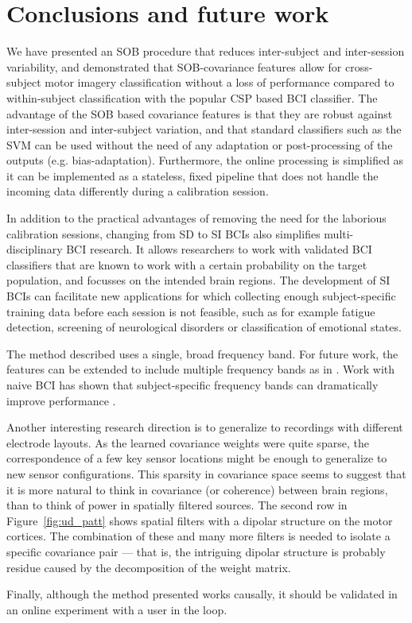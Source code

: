 \section{Conclusions and future work}
\begin{sloppypar}
We have presented an \ac{SOB} procedure that reduces inter-subject and
inter-session variability, and demonstrated that \ac{SOB}-covariance features
allow for cross-subject motor imagery classification without a loss of
performance compared to within-subject classification with the popular \ac{CSP}
based \ac{BCI} classifier.
%
The advantage of the \ac{SOB} based covariance features is that they are robust
against inter-session and inter-subject variation, and that standard
classifiers such as the \ac{SVM} can be used without the need of any adaptation
or post-processing of the outputs (e.g. bias-adaptation).
%
Furthermore, the online processing is simplified as it can be implemented as a
stateless, fixed pipeline that does not handle the incoming data differently
during a calibration session.

In addition to the practical advantages of removing the need for the laborious
calibration sessions, changing from \acl{SD} to \acl{SI} \acp{BCI} also
simplifies multi-disciplinary \ac{BCI} research. It allows researchers to work
with validated \ac{BCI} classifiers that are known to work with a certain
probability on the target population, and focusses on the intended brain
regions.
% 
The development of \acl{SI} \acp{BCI} can facilitate new applications for which
collecting enough subject-specific training data before each session is not
feasible, such as for example fatigue detection, screening of neurological
disorders or classification of emotional states.
\end{sloppypar}

The method described uses a single, broad frequency band. For future work, the
features can be extended to include multiple frequency bands as in
\cite{lotte2009cdt, farquhar2009lfs}. Work with naive \ac{BCI} has shown that subject-specific frequency bands can dramatically improve performance \cite{blankertz2008bbc}.
 
\begin{sloppypar}
Another interesting research direction is to generalize to recordings with
different electrode layouts. As the learned covariance weights were quite
sparse, the correspondence of a few key sensor locations might be enough to
generalize to new sensor configurations. This sparsity in covariance space
seems to suggest that it is more natural to think in covariance (or coherence)
between brain regions, than to think of power in spatially filtered sources.
The second row in Figure~\ref{fig:ud_patt} shows spatial filters with a dipolar
structure on the motor cortices. The combination of these and many more filters
is needed to isolate a specific covariance pair --- that is, the intriguing
dipolar structure is probably residue caused by the decomposition of the weight
matrix.
\end{sloppypar}

Finally, although the method presented works causally, it should be validated in
an online experiment with a user in the loop.
